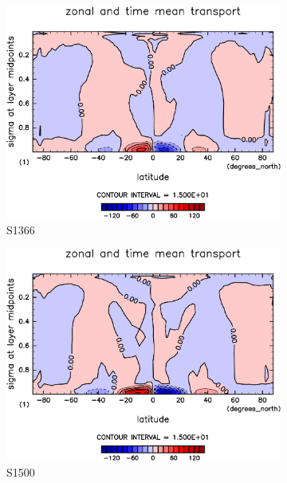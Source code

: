 \documentclass[body]{subfiles}
\begin{document}
\begin{figure}[t]
	\centering
	\begin{subfigure}{.4\textwidth}
		\centering
		\includegraphics[width=\columnwidth]{S1366/MeriHeatTransTest@latentEn_M,time=14600:14965-crop-rotate.pdf}
		\caption{S1366}\label{潜熱平均子午面循環S1366}
	\end{subfigure}
	\begin{subfigure}{.4\textwidth}
		\centering
		\includegraphics[width=\columnwidth]{S1500/MeriHeatTransTest@latentEn_M,time=3650:4015-crop-rotate.pdf}
		\caption{S1500}\label{潜熱平均子午面循環S1500}
	\end{subfigure}
	\begin{subfigure}{.4\textwidth}

\end{subfigure}
\end{figure}
\end{document}
